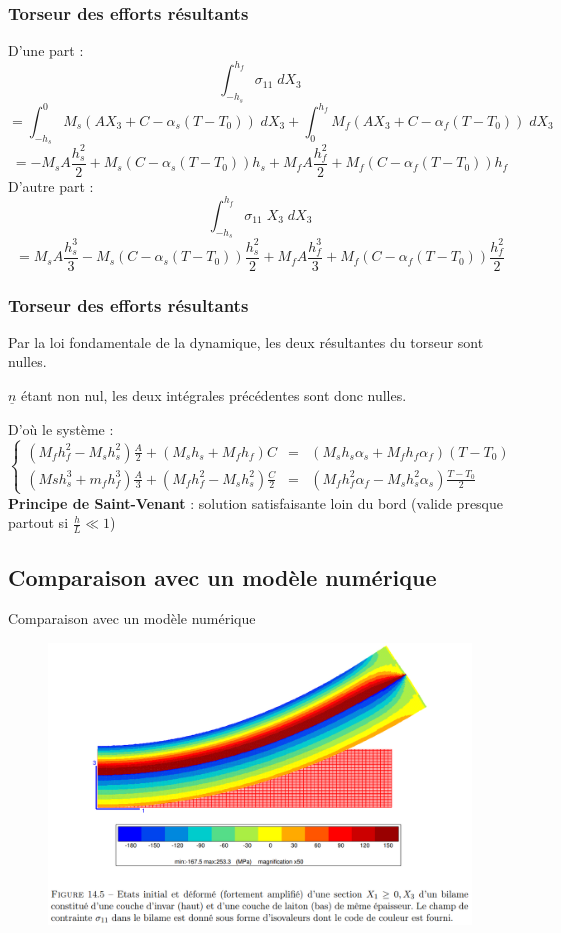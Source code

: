 \documentclass{beamer}
\begin{document}
\begin{frame}
    \frametitle{Torseur des efforts résultants}
    D'une part :
    $$\int_{-h_s}^{h_f}\sigma_{11}\;dX_3$$ $$=\int_{-h_s}^{0}M_s(AX_3+C-\alpha_s(T-T_0))\;dX_3+\int_{0}^{h_f}M_f(AX_3+C-\alpha_f(T-T_0))\;dX_3$$
    $$=-M_sA\frac{h_s^{2}}{2}+M_s(C-\alpha_s(T-T_0))h_s+M_fA\frac{h_f^{2}}{2}+M_f(C-\alpha_f(T-T_0))h_f$$
    D'autre part :
    $$\int_{-h_s}^{h_f}\sigma_{11}\;X_3\;dX_3$$
    $$=M_sA\frac{h_s^{3}}{3}-M_s(C-\alpha_s(T-T_0))\frac{h_s^{2}}{2}+M_fA\frac{h_f^{3}}{3}+M_f(C-\alpha_f(T-T_0))\frac{h_f^{2}}{2}$$
\end{frame}

\begin{frame}
    \frametitle{Torseur des efforts résultants}
    Par la loi fondamentale de la dynamique, les deux résultantes du torseur sont nulles.
    
    $\underline{n}$ étant non nul, les deux intégrales précédentes sont donc nulles.
    
    D'où le système :
    $$
    \left \{
    \begin{array}{rcl}
    (M_fh_f^{2}-M_sh_s^{2})\frac{A}{2}+(M_sh_s+M_fh_f)C&=&(M_sh_s\alpha_s+M_fh_f\alpha_f)(T-T_0) \\
    (Msh_s^{3}+m_fh_f^{3})\frac{A}{3}+(M_fh_f^{2}-M_sh_s^{2})\frac{C}{2}&=&(M_fh_f^{2}\alpha_f-M_sh_s^{2}\alpha_s)\frac{T-T_0}{2}
    \end{array}
    \right.
    $$
    \textbf{Principe de Saint-Venant} : solution satisfaisante loin du bord (valide presque partout si $\frac{h}{L}\ll1$)
\end{frame}

\subsection{Comparaison avec un modèle numérique}

\begin{frame}{Comparaison avec un modèle numérique}
    \begin{figure}
        \centering
        \includegraphics[scale=0.5]{imgs/simul_num.png}
    \end{figure}
\end{frame}
\end{document}

